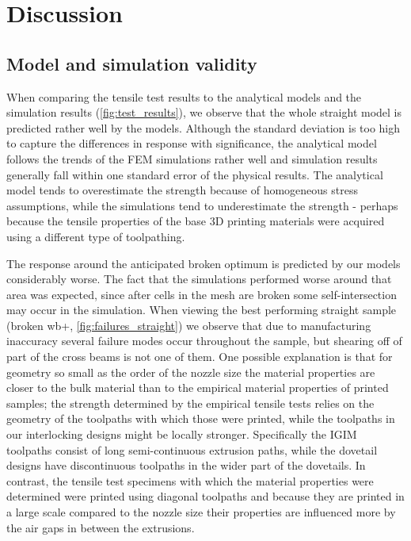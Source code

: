 \section{Discussion}
\subsection{Model and simulation validity}

When comparing the tensile test results to the analytical models and the simulation results (\cref{fig:test_results}),
we observe that the whole straight model is predicted rather well by the models.
Although the standard deviation is too high to capture the differences in response with significance,
the analytical model follows the trends of the FEM simulations rather well and simulation results generally fall within one standard error of the physical results.
The analytical model tends to overestimate the strength because of homogeneous stress assumptions,
while the simulations tend to underestimate the strength - perhaps because the tensile properties of the base 3D printing materials were acquired using a different type of toolpathing.

The response around the anticipated broken optimum is predicted by our models considerably worse.
The fact that the simulations performed worse around that area was expected, since after cells in the mesh are broken some self-intersection may occur in the simulation.
When viewing the best performing straight sample (broken wb+, \cref{fig:failures_straight}) we observe that due to manufacturing inaccuracy several failure modes occur throughout the sample,
but shearing off of part of the cross beams is not one of them.
One possible explanation is that for geometry so small as the order of the nozzle size the material properties are closer to the bulk material than to the empirical material properties of printed samples;
the strength determined by the empirical tensile tests relies on the geometry of the toolpaths with which those were printed, while the toolpaths in our interlocking designs might be locally stronger.
Specifically the IGIM toolpaths consist of long semi-continuous extrusion paths, while the dovetail designs have discontinuous toolpaths in the wider part of the dovetails.
In contrast, the tensile test specimens with which the material properties were determined were printed using diagonal toolpaths
and because they are printed in a large scale compared to the nozzle size their properties are influenced more by the air gaps in between the extrusions.

